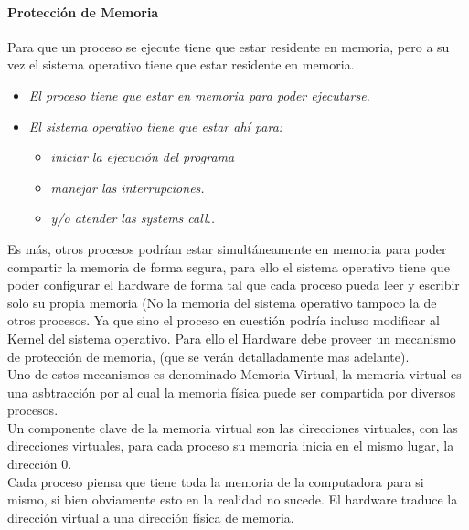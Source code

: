 \documentclass[../main.tex]{subfiles}
\begin{document}
        \paragraph*{Protección de Memoria}
            Para que un proceso se ejecute tiene que estar residente en memoria, pero a su vez el sistema operativo tiene que estar residente en memoria.
            \begin{itemize}
                \item \textit{El proceso tiene que estar en memoria para poder ejecutarse.}
                \item \textit{El sistema operativo tiene que estar ahí para:}
                    \begin{itemize}
                        \item \textit{iniciar la ejecución del programa}
                        \item \textit{manejar las interrupciones.}
                        \item \textit{y/o atender las systems call..}
                    \end{itemize}
            \end{itemize}
            
            Es más, otros procesos podrían estar simultáneamente en memoria para poder compartir la memoria de forma segura, para ello el sistema operativo tiene que poder configurar el hardware de forma tal que cada proceso pueda leer y escribir solo su propia memoria (No la memoria del sistema operativo tampoco la de otros procesos. Ya que sino el proceso en cuestión podría incluso modificar al Kernel del sistema operativo. Para ello el Hardware debe proveer un mecanismo de protección de memoria, (que se verán detalladamente mas adelante).\\

            Uno de estos mecanismos es denominado Memoria Virtual, la memoria virtual es una asbtracción por al cual la memoria física puede ser compartida por diversos procesos.\\

            Un componente clave de la memoria virtual son las direcciones virtuales, con las direcciones virtuales, para cada proceso su memoria inicia en el mismo lugar, la dirección 0.\\

            Cada proceso piensa que tiene toda la memoria de la computadora para si mismo, si bien obviamente esto en la realidad no sucede. El hardware traduce la dirección virtual a una dirección física de memoria.
\end{document}
